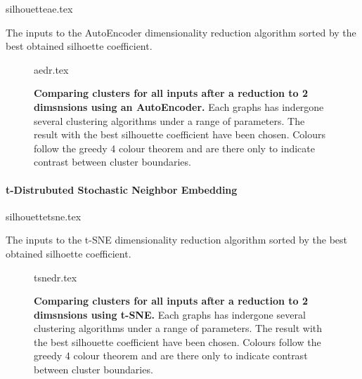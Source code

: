 \begin{table}[H]
    \centering
        {silhouetteae.tex}
        \caption{The inputs to the AutoEncoder dimensionality reduction algorithm sorted by the best obtained silhoette coefficient.  }
        \label{tab:aesil}
\end{table}





\begin{landscape}
\begin{figure}[H]
    {aedr.tex}
    \caption{\textbf{Comparing clusters for all inputs after a reduction to 2 dimsnsions using an AutoEncoder.}
    Each graphs has indergone several clustering algorithms under a range of parameters. The result with the best silhouette coefficient have been chosen. Colours follow the greedy 4 colour theorem and are there only to indicate contrast between cluster boundaries.}
    \label{fig:aevis}
\end{figure}
\end{landscape}










\paragraph*{t-Distrubuted Stochastic Neighbor Embedding}

\begin{table}[H]
    \centering
        {silhouettetsne.tex}
        \caption{The inputs to the t-SNE dimensionality reduction algorithm sorted by the best obtained silhoette coefficient.  }
        \label{tab:tsnesil}
\end{table}




\begin{landscape}
\begin{figure}[H]
    {tsnedr.tex}
    \caption{\textbf{Comparing clusters for all inputs after a reduction to 2 dimsnsions using t-SNE.}
    Each graphs has indergone several clustering algorithms under a range of parameters. The result with the best silhouette coefficient have been chosen. Colours follow the greedy 4 colour theorem and are there only to indicate contrast between cluster boundaries.}
    \label{fig:tsnevis}
\end{figure}
\end{landscape}